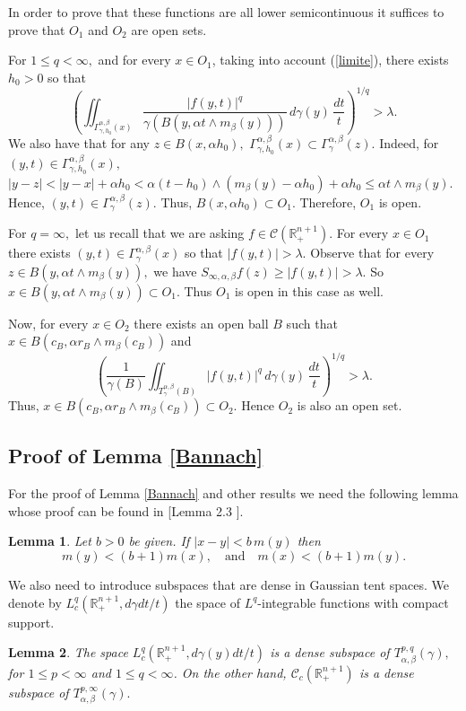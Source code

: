\documentclass[leqno,11pt]{amsart}
\theoremstyle{plain}
\newtheorem{lemma}{Lemma}
\theoremstyle{remark}
\begin{document}
{{{In order to prove that these functions are all lower semicontinuous it suffices to prove that $O_1$ and $O_2$ are open sets.

For $1\le q<\infty,$ and for every $x\in O_1$, taking into account (\ref{limite}), there exists $h_0>0$ so that $$\left(\iint_{\Gamma_{\gamma, h_0}^{\alpha, \beta}(x)}\frac{|f(y,t)|^q}{\gamma(B(y,\alpha t\wedge m_\beta (y)))}\, d\gamma(y)\, \frac{dt}{t}\right)^{1/q}>\lambda.$$ We also have that for any $  z\in B(x,\alpha h_0),$ $\Gamma_{\gamma, h_0}^{\alpha, \beta}(x)\subset \Gamma_\gamma^{\alpha, \beta}(z).$ Indeed, for $(y,t)\in \Gamma_{\gamma, h_0}^{\alpha, \beta}(x),$ $|y-z|<|y-x|+\alpha h_0<\alpha (t-h_0)\wedge(m_\beta(y)-\alpha h_0)+\alpha h_0\le \alpha t\wedge m_\beta(y).$ Hence, $(y,t)\in \Gamma_\gamma^{\alpha,\beta}(z).$ Thus, $B(x,\alpha h_0)\subset O_1.$ Therefore, $O_1$ is open.

For $q=\infty,$ let us recall that we are asking $f\in \mathscr{C}(\mathbb{R}^{n+1}_+).$ For every $x\in O_1$
there exists $(y,t)\in \Gamma_\gamma^{\alpha, \beta}(x)$ so that $|f(y,t)|>\lambda.$ Observe that for every $z\in B(y,\alpha t\wedge m_\beta(y)),$ we have $S_{\infty, \alpha, \beta}f(z)\ge |f(y,t)|>\lambda.$ So $x\in B(y,\alpha t\wedge m_\beta (y))\subset O_1.$ Thus $O_1$ is open in this case as well.

Now, for every $x\in O_2$ there exists an open ball $B$ such that $x\in B(c_B, \alpha r_B\wedge m_\beta (c_B))$ and $$\left(\frac{1}{\gamma(B)}\iint_{T^{\alpha, \beta}_\gamma(B)}|f(y,t)|^q\, d\gamma(y)\, \frac{dt}{t}\right)^{1/q}>\lambda.$$ Thus, $x\in B(c_B, \alpha r_B\wedge m_\beta (c_B))\subset O_2.$ Hence $O_2$ is also an open set.
 


\subsection{Proof of Lemma \ref{Bannach}}\label{proofbanach}

For the proof of Lemma \ref{Bannach} and other results we need the following lemma whose proof can be found in [Lemma 2.3 \cite{MNP}].


  \begin{lemma}\label{comparacion}
Let $b>0$ be given. If $|x-y|<b\, m(y)$ then 
$$m(y)<(b+1)m(x), \quad  \text{and} \quad m(x)<(b+1)m(y).$$
\end{lemma}

  

We also need to introduce subspaces that are dense in Gaussian tent spaces. We denote by $L_c^q(\mathbb{R}^{n+1}_+, d\gamma dt/t)$ the space of $L^q$-integrable functions with compact support.
\begin{lemma}\label{density}
The space $L^q_c(\mathbb{R}^{n+1}_+,d\gamma(y)dt/t)$ is a dense subspace of $T^{p,q}_{\alpha, \beta}(\gamma),$ for $1\le p<\infty$ and $1\le q<\infty$. On the other hand, $\mathscr{C}_c(\mathbb{R}^{n+1}_+)$ is a dense subspace of $T^{p,\infty}_{\alpha, \beta}(\gamma).$
\end{lemma}
 


}}}
\end{document}
